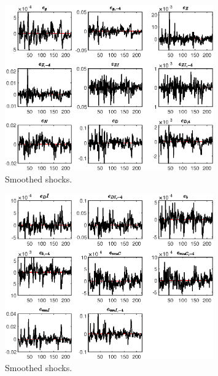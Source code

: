 
\begin{figure}[H]
\centering 
\includegraphics[width=0.80\textwidth]{BRS_sectoral_wo_fixed_cost/graphs/BRS_sectoral_wo_fixed_cost_SmoothedShocks1}
\caption{Smoothed shocks.}\label{Fig:SmoothedShocks:1}
\end{figure}

\begin{figure}[H]
\centering 
\includegraphics[width=0.80\textwidth]{BRS_sectoral_wo_fixed_cost/graphs/BRS_sectoral_wo_fixed_cost_SmoothedShocks2}
\caption{Smoothed shocks.}\label{Fig:SmoothedShocks:2}
\end{figure}


